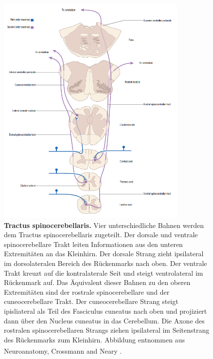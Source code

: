 \documentclass[12pt,a4paper,pdftex]{article}
\begin{document}
\begin{figure}[H]
    \centering
    \includegraphics[width=0.85\textwidth]{pictures/Bilder_Laura/spinocerebellar_tract.PNG}
    \caption[Tractus spinocerebellaris]{\textbf{Tractus spinocerebellaris.} Vier unterschiedliche Bahnen werden dem Tractus spinocerebellaris zugeteilt. Der dorsale und ventrale spinocerebellare Trakt leiten Informationen aus den unteren Extremitäten an das Kleinhirn. Der dorsale Strang zieht ipsilateral im dorsolateralen Bereich des Rückenmarks nach oben. Der ventrale Trakt kreuzt auf die kontralaterale Seit und steigt ventrolateral im Rückenmark auf. Das Äquivalent dieser Bahnen zu den oberen Extremitäten sind der rostrale spinocerebellare und der cuneocerebellare Trakt. Der cuneocerebellare Strang steigt ipisliateral als Teil des Fasciculus cuneatus nach oben und projiziert dann über den Nucleus cuneatus in das Cerebellum. Die Axone des rostralen spinocerebellaren Strangs ziehen ipsilateral im Seitenstrang des Rückenmarks zum Kleinhirn. Abbildung entnommen aus Neuroanatomy, Crossmann and Neary \textsuperscript{\cite[8]{crossman2014neuroanatomy}}.}
    \label{fig:tr_spinocerebellaris}
\end{figure}
\end{document}

